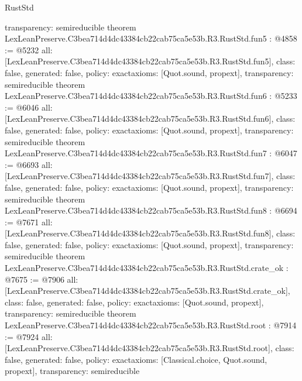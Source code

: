 \begin{lexlean}{RustStd}
\begin{coremodule}
{  transparency: semireducible
}
theorem LexLeanPreserve.C3bea714d4dc43384cb22cab75ca5e53b.R3.RustStd.fun5 : @4858 := @5232 {
  all: [LexLeanPreserve.C3bea714d4dc43384cb22cab75ca5e53b.R3.RustStd.fun5],
  class: false,
  generated: false,
  policy: exact{axioms: [Quot.sound, propext]},
  transparency: semireducible
}
theorem LexLeanPreserve.C3bea714d4dc43384cb22cab75ca5e53b.R3.RustStd.fun6 : @5233 := @6046 {
  all: [LexLeanPreserve.C3bea714d4dc43384cb22cab75ca5e53b.R3.RustStd.fun6],
  class: false,
  generated: false,
  policy: exact{axioms: [Quot.sound, propext]},
  transparency: semireducible
}
theorem LexLeanPreserve.C3bea714d4dc43384cb22cab75ca5e53b.R3.RustStd.fun7 : @6047 := @6693 {
  all: [LexLeanPreserve.C3bea714d4dc43384cb22cab75ca5e53b.R3.RustStd.fun7],
  class: false,
  generated: false,
  policy: exact{axioms: [Quot.sound, propext]},
  transparency: semireducible
}
theorem LexLeanPreserve.C3bea714d4dc43384cb22cab75ca5e53b.R3.RustStd.fun8 : @6694 := @7671 {
  all: [LexLeanPreserve.C3bea714d4dc43384cb22cab75ca5e53b.R3.RustStd.fun8],
  class: false,
  generated: false,
  policy: exact{axioms: [Quot.sound, propext]},
  transparency: semireducible
}
theorem LexLeanPreserve.C3bea714d4dc43384cb22cab75ca5e53b.R3.RustStd.crate_ok : @7675 := @7906 {
  all: [LexLeanPreserve.C3bea714d4dc43384cb22cab75ca5e53b.R3.RustStd.crate_ok],
  class: false,
  generated: false,
  policy: exact{axioms: [Quot.sound, propext]},
  transparency: semireducible
}
theorem LexLeanPreserve.C3bea714d4dc43384cb22cab75ca5e53b.R3.RustStd.root : @7914 := @7924 {
  all: [LexLeanPreserve.C3bea714d4dc43384cb22cab75ca5e53b.R3.RustStd.root],
  class: false,
  generated: false,
  policy: exact{axioms: [Classical.choice, Quot.sound, propext]},
  transparency: semireducible
}


\end{coremodule}
\end{lexlean}
